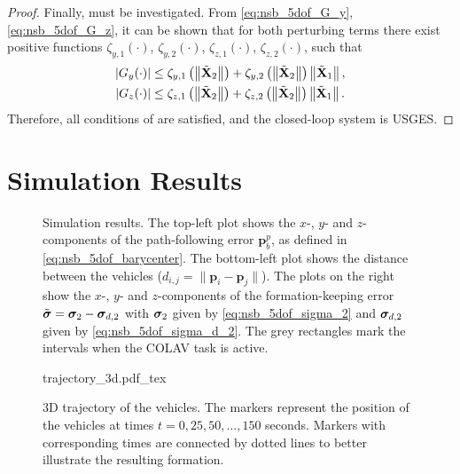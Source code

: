 \begin{proof}
Finally, \cite[Assumption 2]{pettersen_lyapunov_2017} must be investigated.
From \eqref{eq:nsb_5dof_G_y}, \eqref{eq:nsb_5dof_G_z}, it can be shown that for both perturbing terms there exist positive functions $\zeta_{y,1}(\cdot)$, $\zeta_{y,2}(\cdot)$, $\zeta_{z,1}(\cdot)$, $\zeta_{z,2}(\cdot)$, such that
\begin{align}
    \left|G_y(\cdot)\right| &\leq \zeta_{y,1}\left(\left\|\tilde{\mathbf{X}}_2\right\|\right) + \zeta_{y,2}\left(\left\|\tilde{\mathbf{X}}_2\right\|\right)\left\|\tilde{\mathbf{X}}_1\right\|, \\
    \left|G_z(\cdot)\right| &\leq \zeta_{z,1}\left(\left\|\tilde{\mathbf{X}}_2\right\|\right) + \zeta_{z,2}\left(\left\|\tilde{\mathbf{X}}_2\right\|\right)\left\|\tilde{\mathbf{X}}_1\right\|.
\end{align}
Therefore, all conditions of \cite[Proposition 9]{pettersen_lyapunov_2017} are satisfied, and the closed-loop system is USGES.    
\end{proof}

\section{Simulation Results}
\label{sec:nsb_5dof_simulations}

\begin{figure}[p]
    \centering
    
    \vspace{-1.5mm}
    \caption{Simulation results. The top-left plot shows the $x$-, $y$- and $z$-components of the path-following error $\mathbf{p}_b^p$, as defined in \eqref{eq:nsb_5dof_barycenter}. The bottom-left plot shows the distance between the vehicles ($d_{i,j} = \|\mathbf{p}_i - \mathbf{p}_j\|$). The plots on the right show the $x$-, $y$- and $z$-components of the formation-keeping error $\tilde{\bm{\sigma}} = \bm{\sigma}_2 - \bm{\sigma}_{d,2}$ with $\bm{\sigma}_2$ given by \eqref{eq:nsb_5dof_sigma_2} and $\bm{\sigma}_{d,2}$ given by \eqref{eq:nsb_5dof_sigma_d_2}. The grey rectangles mark the intervals when the COLAV task is active.}
    \label{fig:nsb_5dof_results}
    \vspace{-5mm}
\end{figure}
\begin{figure}[p]
    \centering
    \def\svgwidth{.8\textwidth}
    {trajectory_3d.pdf_tex}
    \caption{3D trajectory of the vehicles. The markers represent the position of the vehicles at times $t = 0, 25, 50, \ldots, 150$ seconds. Markers with corresponding times are connected by dotted lines to better illustrate the resulting formation.}
    \label{fig:nsb_5dof_trajectory}
\end{figure}

